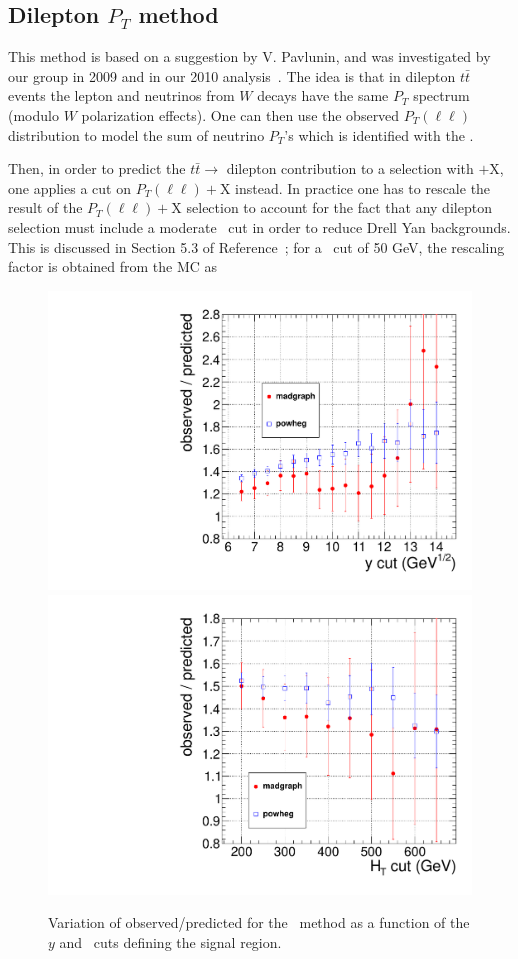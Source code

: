 \subsection{Dilepton $P_T$ method}
\label{sec:victory}
This method is based on a suggestion by V. Pavlunin\cite{ref:victory},
and was investigated by our group in 2009\cite{ref:ourvictory} and
in our 2010 analysis~\cite{ref:ospaper}.
The idea is that in dilepton $t\bar{t}$ events the lepton and neutrinos
from $W$ decays have the same $P_T$ spectrum (modulo $W$ polarization 
effects).  One can then use the observed 
$P_T(\ell\ell)$ distribution to model the sum of neutrino $P_T$'s which 
is identified with the \met.

Then, in order to predict the $t\bar{t} \to$ dilepton contribution to a 
selection with \met$+$X, one applies a cut on $P_T(\ell\ell)+$X instead.
In practice one has to rescale the result of the $P_T(\ell\ell)+$X selection
to account for the fact that any dilepton selection must include a 
moderate \met\ cut in order to reduce Drell Yan backgrounds.  This 
is discussed in Section 5.3 of Reference~\cite{ref:ourvictory}; for a \met\
cut of 50 GeV, the rescaling factor is obtained from the MC as

\begin{figure}[hbt]
\begin{center}
\includegraphics[width=0.48\linewidth]{plots/victory_yvary.pdf}
\includegraphics[width=0.48\linewidth]{plots/victory_htvary.pdf}
\caption{\label{fig:victory}\protect Variation of observed/predicted
for the \ptll\ method as a function of the $y$ and \Ht\ cuts defining
the signal region.}
\end{center}
\end{figure}

